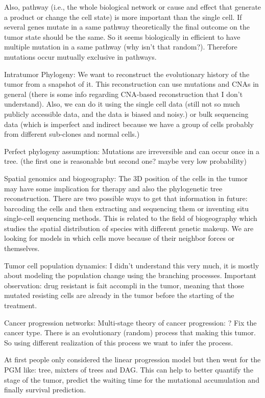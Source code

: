\documentclass[]{article}
\begin{document}
	Also, pathway (i.e., the whole biological network or cause and effect that generate a product or change the cell state) is more important than the single cell. 
	If several genes mutate in a same pathway theoretically the final outcome on the tumor state should be the same. 
	So it seems biologically in efficient to have multiple mutation in a same pathway (why isn't that random?). 
	Therefore mutations occur mutually exclusive in pathways. 
	
	Intratumor Phylogeny:
	We want to reconstruct the evolutionary history of the tumor from a snapshot of it. 
	This reconstruction can use mutations and CNAs in general (there is some info regarding CNA-based reconstruction that I don't understand). 
	Also, we can do it using the single cell data (still not so much publicly accessible data, and the data is biased and noisy.) or bulk sequencing data (which is imperfect and indirect because we have a group of cells probably from different sub-clones and normal cells.)
	
	Perfect phylogeny assumption:
	Mutations are irreversible and can occur once in a tree. (the first one is reasonable but second one? maybe very low probability)
	
	Spatial genomics and biogeography:
	The 3D position of the cells in the tumor may have some implication for therapy and also the phylogenetic tree reconstruction. 
	There are two possible ways to get that information in future: barcoding the cells and then extracting and sequencing them or inventing situ single-cell sequencing methods. 
	This is related to the field of biogeography which studies the spatial distribution of species with different genetic makeup. 
	We are looking for models in which cells move because of their neighbor forces or themselves. 
	
	Tumor cell population dynamics:
	I didn't understand this very much, it is mostly about modeling the population change using the branching processes. 
	Important observation: drug resistant is fait accompli in the tumor, meaning that those mutated resisting cells are already in the tumor before the starting of the treatment. 
	
	Cancer progression networks:
	Multi-stage theory of cancer progression: ? 
	Fix the cancer type. There is an evolutionary (random) process that making this tumor. 
	So using different realization of this process we want to infer the process. 
	
	At first people only considered the linear progression model but then went for the PGM like: tree, mixters of trees and DAG. 
	This can help to better quantify the stage of the tumor, predict the waiting time for the mutational accumulation and finally survival prediction. 
	
\end{document}
